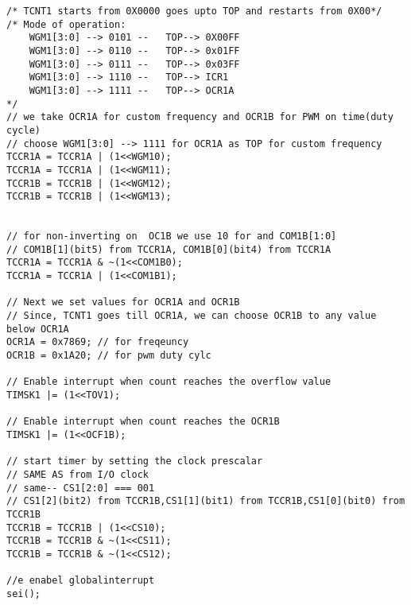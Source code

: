 \documentclass{article}
\begin{document}
\begin{verbatim}
/* TCNT1 starts from 0X0000 goes upto TOP and restarts from 0X00*/
/* Mode of operation:
    WGM1[3:0] --> 0101 --	TOP--> 0X00FF
    WGM1[3:0] --> 0110 --	TOP--> 0x01FF
    WGM1[3:0] --> 0111 --	TOP--> 0x03FF
    WGM1[3:0] --> 1110 --	TOP--> ICR1
    WGM1[3:0] --> 1111 --	TOP--> OCR1A
*/	
// we take OCR1A for custom frequency and OCR1B for PWM on time(duty cycle)	
// choose WGM1[3:0] --> 1111 for OCR1A as TOP for custom frequency
TCCR1A = TCCR1A | (1<<WGM10);
TCCR1A = TCCR1A | (1<<WGM11);
TCCR1B = TCCR1B | (1<<WGM12);
TCCR1B = TCCR1B | (1<<WGM13);


// for non-inverting on  OC1B we use 10 for and COM1B[1:0]	
// COM1B[1](bit5) from TCCR1A, COM1B[0](bit4) from TCCR1A
TCCR1A = TCCR1A & ~(1<<COM1B0);
TCCR1A = TCCR1A | (1<<COM1B1);

// Next we set values for OCR1A and OCR1B
// Since, TCNT1 goes till OCR1A, we can choose OCR1B to any value below OCR1A
OCR1A = 0x7869; // for freqeuncy
OCR1B = 0x1A20; // for pwm duty cylc

// Enable interrupt when count reaches the overflow value
TIMSK1 |= (1<<TOV1);

// Enable interrupt when count reaches the OCR1B
TIMSK1 |= (1<<OCF1B);

// start timer by setting the clock prescalar
// SAME AS from I/O clock
// same-- CS1[2:0] === 001
// CS1[2](bit2) from TCCR1B,CS1[1](bit1) from TCCR1B,CS1[0](bit0) from TCCR1B
TCCR1B = TCCR1B | (1<<CS10);
TCCR1B = TCCR1B & ~(1<<CS11);
TCCR1B = TCCR1B & ~(1<<CS12);

//e enabel globalinterrupt
sei();
\end{verbatim}
\end{document}
